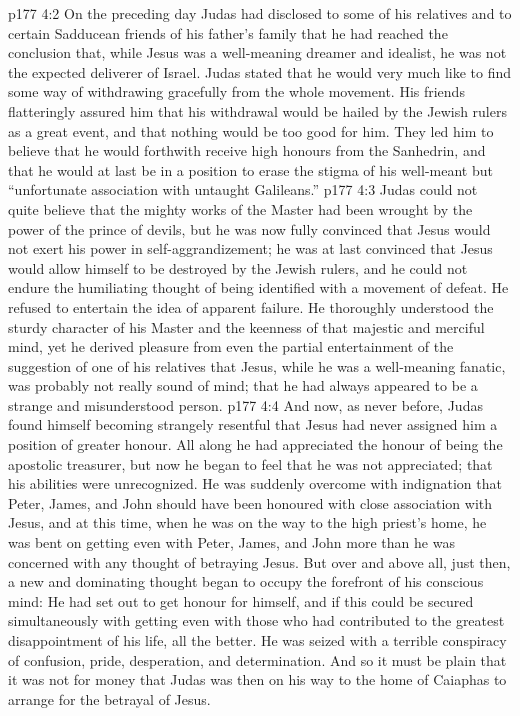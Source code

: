 \vs p177 4:2 On the preceding day Judas had disclosed to some of his relatives and to certain Sadducean friends of his father’s family that he had reached the conclusion that, while Jesus was a well\hyp{}meaning dreamer and idealist, he was not the expected deliverer of Israel. Judas stated that he would very much like to find some way of withdrawing gracefully from the whole movement. His friends flatteringly assured him that his withdrawal would be hailed by the Jewish rulers as a great event, and that nothing would be too good for him. They led him to believe that he would forthwith receive high honours from the Sanhedrin, and that he would at last be in a position to erase the stigma of his well\hyp{}meant but “unfortunate association with untaught Galileans.”
\vs p177 4:3 Judas could not quite believe that the mighty works of the Master had been wrought by the power of the prince of devils, but he was now fully convinced that Jesus would not exert his power in self\hyp{}aggrandizement; he was at last convinced that Jesus would allow himself to be destroyed by the Jewish rulers, and he could not endure the humiliating thought of being identified with a movement of defeat. He refused to entertain the idea of apparent failure. He thoroughly understood the sturdy character of his Master and the keenness of that majestic and merciful mind, yet he derived pleasure from even the partial entertainment of the suggestion of one of his relatives that Jesus, while he was a well\hyp{}meaning fanatic, was probably not really sound of mind; that he had always appeared to be a strange and misunderstood person.
\vs p177 4:4 And now, as never before, Judas found himself becoming strangely resentful that Jesus had never assigned him a position of greater honour. All along he had appreciated the honour of being the apostolic treasurer, but now he began to feel that he was not appreciated; that his abilities were unrecognized. He was suddenly overcome with indignation that Peter, James, and John should have been honoured with close association with Jesus, and at this time, when he was on the way to the high priest’s home, he was bent on getting even with Peter, James, and John more than he was concerned with any thought of betraying Jesus. But over and above all, just then, a new and dominating thought began to occupy the forefront of his conscious mind: He had set out to get honour for himself, and if this could be secured simultaneously with getting even with those who had contributed to the greatest disappointment of his life, all the better. He was seized with a terrible conspiracy of confusion, pride, desperation, and determination. And so it must be plain that it was not for money that Judas was then on his way to the home of Caiaphas to arrange for the betrayal of Jesus.
